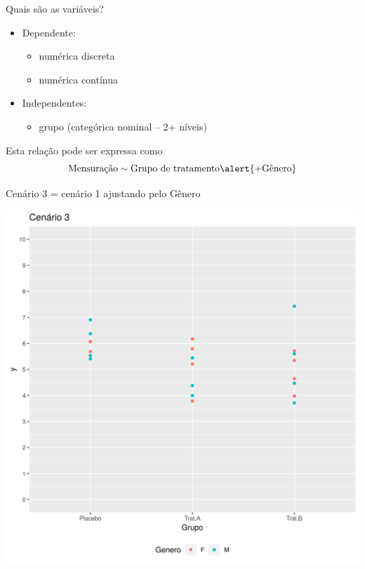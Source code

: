\documentclass{beamer}
\begin{document}
\begin{frame}{Quais são as variáveis?}
  \begin{itemize}
    \small
  \item Dependente:
    \begin{itemize}
      \footnotesize
    \item numérica discreta
    \item numérica contínua
    \end{itemize}
  \item Independentes:
    \begin{itemize}
      \footnotesize
    \item grupo (categórica nominal -- 2+ níveis)
    \end{itemize}
  \end{itemize}
  \vfill
  \begin{block}{Esta relação pode ser expressa como}
    \begin{displaymath}
      \text{Mensuração} \sim \text{Grupo de tratamento} \alert{+ \text{Gênero}}
    \end{displaymath}
  \end{block}
\end{frame}


\begin{frame}[label=cenario3]{\small Cenário 3 = cenário 1 ajustando pelo Gênero}
  \begin{center}
    \includegraphics[height=.9\textheight]{Cap13-30/cenario12}
  \end{center}
\end{frame}
\end{document}
